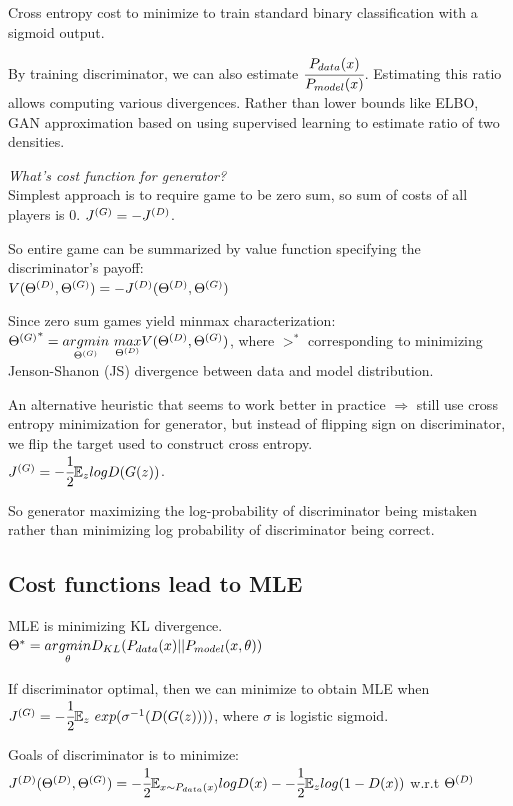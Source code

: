\documentclass[12pt,a4paper]{article}
\begin{document}
Cross entropy cost to minimize to train standard binary classification with a sigmoid output. 

By training discriminator, we can also estimate $\cfrac{P_{data}(x)}{P_{model}(x)}$. Estimating this ratio allows computing various divergences. 
Rather than lower bounds like ELBO, GAN approximation based on using supervised learning to estimate ratio of two densities. 

\vspace{0.5cm}
\textit{What's cost function for generator?}\\
Simplest approach is to require game to be zero sum, so sum of costs of all players is 0. $J^{(G)}=-J^{(D)}$. 

So entire game can be summarized by value function specifying the discriminator's payoff: \\
$V({\Theta^{(D)}},{\Theta^{(G)}})=-J^{(D)}({\Theta^{(D)}},{\Theta^{(G)}})$

Since zero sum games yield minmax characterization: \\
${\gt}^* =\argminp{\gt}\ \underset{\dt}{max}V(\dt,\gt)$, where ${\gt}^*$ corresponding to minimizing Jenson-Shanon (JS) divergence between data and model distribution.

An alternative heuristic that seems to work better in practice $\Rightarrow$ still use cross entropy minimization for generator, but instead of flipping sign on discriminator, we flip the target used to construct cross entropy. \\
$J^{(G)}=-\cfrac{1}{2} \mathbb{E}_z logD(G(z))$. 

So generator maximizing the log-probability of discriminator being mistaken rather than minimizing log probability of discriminator  being correct.

\subsection{Cost functions lead to MLE}

MLE is minimizing KL divergence. \\
$\Theta^*=\underset{\theta}{argmin}D_{KL}(P_{data}(x)||P_{model}(x,\theta))$

If discriminator optimal, then we can minimize to obtain MLE when 
$\jg=\mhalf\ee_z\ exp(\sigma^{-1}(D(G(z))))$, where $\sigma$ is logistic sigmoid. 


\vspace{0.5cm}
Goals of discriminator is to minimize: \\
$J^{(D)}({\Theta^{(D)}},{\Theta^{(G)}})=-\cfrac{1}{2} \mathbb{E}_{x\sim P_{data}(x)}logD(x)--\cfrac{1}{2} \mathbb{E}_z log(1-D(x))$ w.r.t ${\Theta^{(D)}}$
\end{document}
